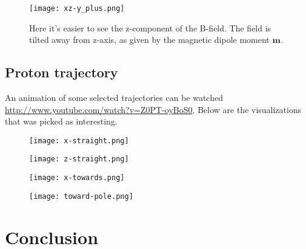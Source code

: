 \documentclass[11pt,a4paper]{article}
\begin{document}
\begin{center}
\begin{figure}[htbp] %
\label{figure.B-field}
\texttt{[image: xz-y\_plus.png]}
\caption{Here it's easier to see the z-component of the B-field. The field is tilted away from z-axis, as given by the magnetic dipole moment $\textbf{m}$.}
\end{figure}
\end{center}

\subsection{Proton trajectory}
An animation of some selected trajectories can be watched \href{here}{http://www.youtube.com/watch?v=Z0PT-oyBoS0}. Below are the visualizations that was picked as interesting.
\begin{center}
\begin{figure}[htbp] %
\label{figure.B-field}
\texttt{[image: x-straight.png]}
\caption{}
\end{figure}
\end{center}
\begin{center}
\begin{figure}[htbp] %
\label{figure.B-field}
\texttt{[image: z-straight.png]}
\caption{}
\end{figure}
\end{center}
\begin{center}
\begin{figure}[htbp] %
\label{figure.B-field}
\texttt{[image: x-towards.png]}
\caption{}
\end{figure}
\end{center}
\begin{center}
\begin{figure}[htbp] %
\label{figure.B-field}
\texttt{[image: toward-pole.png]}
\caption{}
\end{figure}
\end{center}

\section{Conclusion}
\end{document}
